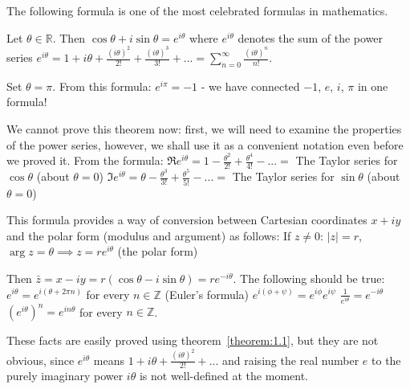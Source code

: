 The following formula is one of the most celebrated formulas in mathematics.

\begin{theorem}\label{theorem:1.1}
Let $\theta \in \mathbb{R}$. Then $\cos\theta + i\sin\theta = e^{i\theta}$ where $e^{i\theta}$ denotes the sum of the power series $e^{i\theta} = 1 + i\theta + \frac{(i\theta)^2}{2!} + \frac{(i\theta)^3}{3!} + ... = \sum_{n=0}^{\infty}\frac{(i\theta)^n}{n!}$.
\end{theorem}

Set $\theta = \pi$. From this formula: $e^{i\pi} = -1$ - we have connected $-1$, $e$, $i$, $\pi$ in one formula!

We cannot prove this theorem now: first, we will need to examine the properties of the power series, however, we shall use it as a convenient notation even before we proved it. From the formula:
$\Re e^{i\theta} = 1 - \frac{\theta^2}{2!} + \frac{\theta^4}{4!} - ... = $ The Taylor series for $\cos\theta$ (about $\theta = 0$)
$\Im e^{i\theta} = \theta - \frac{\theta^3}{3!} + \frac{\theta^5}{5!} - ... = $ The Taylor series for $\sin\theta$ (about $\theta = 0$)

This formula provides a way of conversion between Cartesian coordinates $x+iy$ and the polar form (modulus and argument) as follows:
If $z\neq 0$: $\lvert z\rvert=r$, $\arg z = \theta \implies z = re^{i\theta}$ (the polar form)

Then $\bar{z} = x-iy = r(\cos\theta - i\sin\theta) = re^{-i\theta}$.
The following should be true:
$e^{i\theta} = e^{i(\theta + 2\pi n)}$ for every $n\in\mathbb{Z}$ (Euler's formula)
$e^{i(\phi + \psi)} = e^{i\phi}e^{i\psi}$
$\frac{1}{e^{i\theta}} = e^{-i\theta}$
$(e^{i\theta})^n = e^{in\theta}$ for every $n\in\mathbb{Z}$.

These facts are easily proved using theorem~\ref{theorem:1.1}, but they are not obvious, 
since $e^{i\theta}$ means $1 + i\theta + \frac{(i\theta)^2}{2!} + ...$ and raising the real 
number $e$ to the purely imaginary power $i\theta$ is not well-defined at the moment.